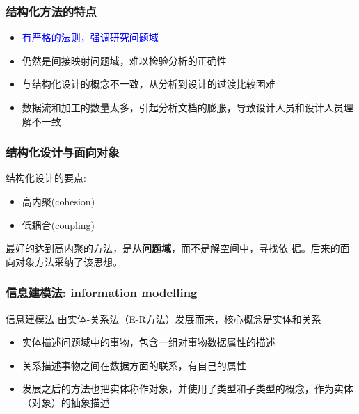 \documentclass[compress]{beamer}
\begin{document}
\begin{frame}
\frametitle{结构化方法的特点}
\begin{itemize}
\item \textcolor{blue}{有严格的法则，强调研究问题域}
\item 仍然是间接映射问题域，难以检验分析的正确性
\item 与结构化设计的概念不一致，从分析到设计的过渡比较困难
\item 数据流和加工的数量太多，引起分析文档的膨胀，导致设计人员和设计人员理解不一致
\end{itemize}

\end{frame}

\begin{frame}
    \frametitle{结构化设计与面向对象}

    结构化设计的要点: \\

    \begin{itemize}
        \item 高内聚(cohesion)
        \item 低耦合(coupling)
    \end{itemize}

    最好的达到高内聚的方法，是从\textbf{问题域}，而不是解空间中，寻找依
    据。后来的面向对象方法采纳了该思想。

\end{frame}

\begin{frame}
\frametitle{信息建模法: information modelling}
\begin{block}{信息建模法}
由实体-关系法（E-R方法）发展而来，核心概念是实体和关系
\begin{itemize}
\item 实体描述问题域中的事物，包含一组对事物数据属性的描述
\item 关系描述事物之间在数据方面的联系，有自己的属性
\item 发展之后的方法也把实体称作对象，并使用了类型和子类型的概念，作为实体（对象）的抽象描述
\end{itemize}
\end{block}
\end{frame}
\end{document}
